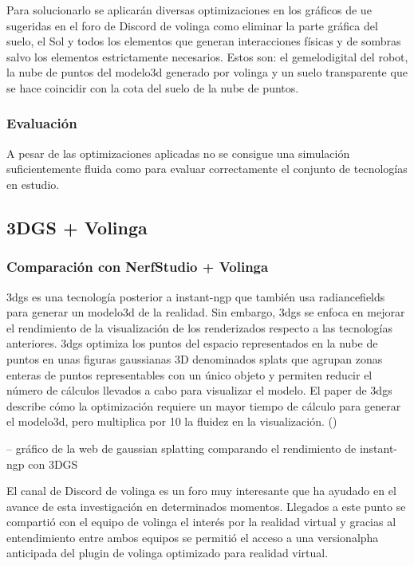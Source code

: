 \documentclass[a4paper, 12pt, spanish, twoside]{article}
\begin{document}
Para solucionarlo se aplicarán diversas optimizaciones en los gráficos de \acrshort{ue} sugeridas en el foro de Discord de \gls{volinga} como eliminar la parte gráfica del suelo, el Sol y todos los elementos que generan interacciones físicas y de sombras salvo los elementos estrictamente necesarios. Estos son: el \gls{gemelodigital} del robot, la nube de puntos del \gls{modelo3d} generado por \gls{volinga} y un suelo transparente que se hace coincidir con la cota del suelo de la nube de puntos. 

\subsubsection{Evaluación} \label{sec:implementacion:nerfstudio-volinga:evaluacion}

A pesar de las optimizaciones aplicadas no se consigue una simulación suficientemente fluida como para evaluar correctamente el conjunto de tecnologías en estudio. 

\subsection{3DGS + Volinga} \label{sec:implementacion:3dgs-volinga}

\subsubsection{Comparación con NerfStudio + Volinga} \label{sec:implementacion:3dgs-volinga:comparacion}

\acrfull{3dgs} es una tecnología posterior a \gls{instant-ngp} que también usa \glspl{radiancefield} para generar un \gls{modelo3d} de la realidad. Sin embargo, \acrshort{3dgs} se enfoca en mejorar el rendimiento de la visualización de los renderizados respecto a las tecnologías anteriores. \acrshort{3dgs} optimiza los puntos del espacio representados en la nube de puntos en unas figuras gaussianas 3D denominados \glspl{splat} que agrupan zonas enteras de puntos representables con un único objeto y permiten reducir el número de cálculos llevados a cabo para visualizar el modelo. El paper de \acrshort{3dgs} describe cómo la optimización requiere un mayor tiempo de cálculo para generar el \gls{modelo3d}, pero multiplica por 10 la fluidez en la visualización. (\cite{kerbl3Dgaussians}) 

-- gráfico de la web de gaussian splatting comparando el rendimiento de instant-ngp con 3DGS 

El canal de Discord de \gls{volinga} es un foro muy interesante que ha ayudado en el avance de esta investigación en determinados momentos. Llegados a este punto se compartió con el equipo de \gls{volinga} el interés por la realidad virtual y gracias al entendimiento entre ambos equipos se permitió el acceso a una \gls{versionalpha} anticipada del \gls{plugin} de \gls{volinga} optimizado para realidad virtual. 
\end{document}
